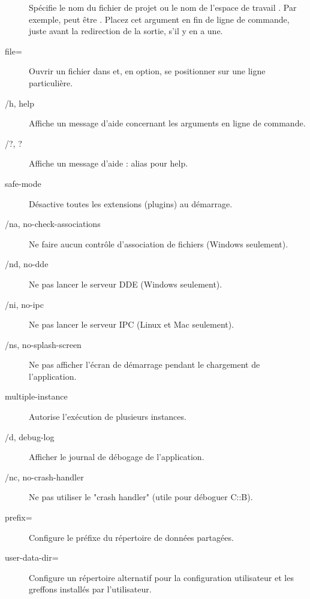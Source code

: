 \begin{description}
\item[] Spécifie le nom du fichier de projet  ou le nom de l'espace de travail . Par exemple,  peut être . Placez cet argument en fin de ligne de commande, juste avant la redirection de la sortie, s'il y en a une.
\item[\opt{--}file=] Ouvrir un fichier dans \codeblocks et, en option, se positionner sur une ligne particulière.
\item[/h, \opt{--}help] Affiche un message d'aide concernant les arguments en ligne de commande.
\item[/?, \opt{--}?] Affiche un message d'aide : alias pour help.
\item[\opt{--}safe-mode] Désactive toutes les extensions (plugins) au démarrage.
\item[/na, \opt{--}no-check-associations] Ne faire aucun contrôle d'association de fichiers (Windows seulement).
\item[/nd, \opt{--}no-dde] Ne pas lancer le serveur DDE (Windows seulement).
\item[/ni, \opt{--}no-ipc] Ne pas lancer le serveur IPC (Linux et Mac seulement).
\item[/ns, \opt{--}no-splash-screen] Ne pas afficher l'écran de démarrage pendant le chargement de l'application.
\item[\opt{--}multiple-instance] Autorise l'exécution de plusieurs instances.
\item[/d, \opt{--}debug-log] Afficher le journal de débogage de l'application.
\item[/nc, \opt{--}no-crash-handler] Ne pas utiliser le "crash handler" (utile pour déboguer C::B).
\item[\opt{--}prefix=] Configure le préfixe du répertoire de données partagées.
\item[\opt{--}user-data-dir=] Configure un répertoire alternatif pour la configuration utilisateur et les greffons installés par l'utilisateur.

\end{description}
